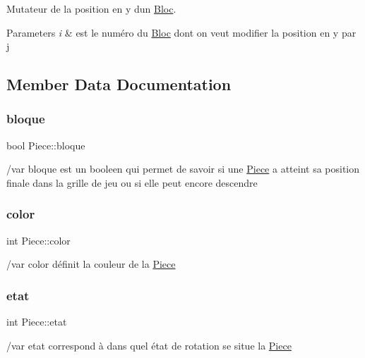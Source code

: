 Mutateur de la position en y d\textquotesingle{}un \hyperlink{classBloc}{Bloc}. 


\begin{DoxyParams}{Parameters}
{\em i} & est le numéro du \hyperlink{classBloc}{Bloc} dont on veut modifier la position en y par j \\
\hline
\end{DoxyParams}


\subsection{Member Data Documentation}
\mbox{\label{classPiece_a99b4e2bbf91e0e609fc5141135a2e0ad}} 
\subsubsection{\texorpdfstring{bloque}{bloque}}
{\footnotesize\ttfamily bool Piece\+::bloque\hspace{0.3cm}{\ttfamily [protected]}}

/var bloque est un booleen qui permet de savoir si une \hyperlink{classPiece}{Piece} a atteint sa position finale dans la grille de jeu ou si elle peut encore descendre \mbox{\label{classPiece_a4268f3b047e1ad284882708b85332ef1}} 
\subsubsection{\texorpdfstring{color}{color}}
{\footnotesize\ttfamily int Piece\+::color\hspace{0.3cm}{\ttfamily [protected]}}

/var color définit la couleur de la \hyperlink{classPiece}{Piece} \mbox{\label{classPiece_a9632e25aa0e79f8161451a937ccfc7ad}} 
\subsubsection{\texorpdfstring{etat}{etat}}
{\footnotesize\ttfamily int Piece\+::etat\hspace{0.3cm}{\ttfamily [protected]}}

/var etat correspond à dans quel état de rotation se situe la \hyperlink{classPiece}{Piece} \mbox{\label{classPiece_af0c815c20f2000c02b6d7ce5b6703651}} 
